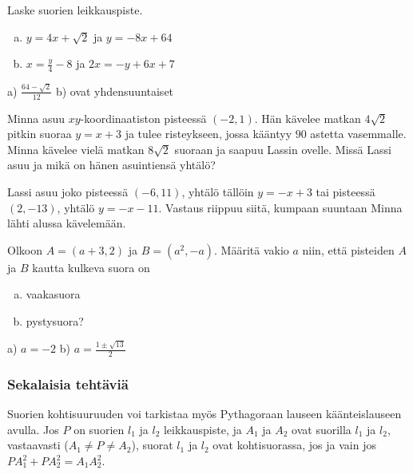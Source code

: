 \begin{tehtavasivu}
\begin {tehtava}
Laske suorien leikkauspiste.
\begin{enumerate} [a)]
\item $y=4x+\sqrt{2}$ ja $y=-8x+64$
\item $x=\frac{y}{4}-8$ ja $2x=-y+6x+7$
\end{enumerate}
\begin {vastaus}
a) $\frac{64-\sqrt{2}}{12}$ b) ovat yhdensuuntaiset
\end {vastaus}
\end {tehtava}

\begin {tehtava}
Minna asuu $xy$-koordinaatiston pisteessä $(-2, 1)$. Hän kävelee matkan $4\sqrt{2}$ pitkin suoraa $y=x+3$ ja tulee risteykseen, jossa kääntyy $90$ astetta vasemmalle. Minna kävelee vielä matkan $8\sqrt{2}$ suoraan ja saapuu Lassin ovelle. Missä Lassi asuu ja mikä on hänen asuintiensä yhtälö?
\begin {vastaus}
Lassi asuu joko pisteessä $(-6, 11)$, yhtälö tällöin $y=-x+3$ tai pisteessä $(2, -13)$, yhtälö $y=-x-11$. Vastaus riippuu siitä, kumpaan suuntaan Minna lähti alussa kävelemään.
\end {vastaus}
\end {tehtava}

\begin {tehtava}
Olkoon $A=(a+3, 2)$ ja $B=(a^2, -a)$. Määritä vakio $a$ niin, että pisteiden $A$ ja $B$ kautta kulkeva suora on
\begin{enumerate} [a)]
\item vaakasuora
\item pystysuora?
\end{enumerate}
\begin {vastaus}
a) $a=-2$ b) $a=\frac{1\pm\sqrt{13}}{2} $
\end {vastaus}
\end {tehtava}

\subsubsection*{Sekalaisia tehtäviä}

\begin{tehtava}
Suorien kohtisuuruuden voi tarkistaa myös Pythagoraan lauseen käänteislauseen avulla. Jos $P$ on suorien $l_1$ ja $l_2$ leikkauspiste, ja $A_1$ ja $A_2$ ovat suorilla $l_1$ ja $l_2$, vastaavasti ($A_1 \neq P \neq A_2$), suorat $l_1$ ja $l_2$ ovat kohtisuorassa, jos ja vain jos $PA_1^2+PA_2^2 = A_1A_2^2$.
\begin{alakohdat}
\end{alakohdat}
\begin{vastaus}
\begin{alakohdat}
\end{alakohdat}
\end{vastaus}
\end{tehtava}


\end{tehtavasivu}
